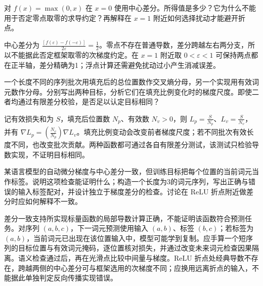 \begin{exercises}
\begin{exercise} 对 $f(x)=\max(0,x)$ 在 $x=0$ 使用中心差分。所得值是多少？它为什么不能用于否定零点取零的求导约定？再解释在 $x=1$ 附近如何选择扰动才能避开折点。

\begin{solution}
中心差分为 $\frac{[f(\varepsilon)-f(-\varepsilon)]}{2\varepsilon}=\frac{1}{2}$。零点不存在普通导数，差分跨越左右两分支，所以不能据此否定框架取零的次梯度约定。在 $x=1$ 附近取 $0<\varepsilon<1$ 可保持两点都在正半轴，差分精确为1；浮点计算还需避免扰动过小产生消减误差。
\end{solution}
\end{exercise}

\begin{exercise} 一个长度不同的序列批次用填充后的总位置数作交叉熵分母，另一个实现用有效词元数作分母。分别写出两种目标，分析它们在填充比例变化时的梯度尺度。即使二者均通过有限差分校验，是否足以认定目标相同？

\begin{solution}
记有效损失和为 $S$，填充后位置数 $N_p$、有效数 $N_v>0$，则 $L_p=\frac{S}{N_p}$、$L_v=\frac{S}{N_v}$，并有 $\nabla L_p=(\frac{N_v}{N_p})\nabla L_v$。填充比例变动会改变前者梯度尺度；若不同批次有效长度不同，也改变批次贡献。两种函数都可通过各自有限差分测试，该测试只检验导数实现，不证明目标相同。
\end{solution}
\end{exercise}

\begin{exercise} 某语言模型的自动微分梯度与中心差分一致，但训练目标把每个位置的当前词元当作标签。说明这项检查能证明什么；构造一个长度为3的词元序列，写出正确与错误的输入标签配对，并设计独立于梯度差分的检查。讨论在 ReLU 折点附近做差分时应如何解释不一致。

\begin{solution}
差分一致支持所实现标量函数的局部导数计算正确，不能证明该函数符合预测任务。对序列 $(a,b,c)$，下一词元预测使用输入 $(a,b)$、标签 $(b,c)$；若标签为 $(a,b)$，当前词元已出现在该位置输入中，模型可能学到复制。应手算一个短序列的目标位置与有效词元掩码，逐位置核对损失，并通过改变未来词元检查因果隔离。语义检查通过后，再在光滑点比较中间量与梯度。ReLU 折点处经典导数不存在，跨越两侧的中心差分可与框架选用的次梯度不同；应换用远离折点的输入，不能据此单独判定反向传播实现错误。
\end{solution}
\end{exercise}

\end{exercises}

